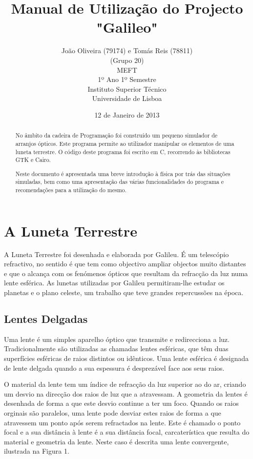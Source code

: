 \documentclass[a4paper,12pt]{article}
\begin{document}
\title{\bf Manual de Utilização do Projecto "Galileo"}
\author{João Oliveira (79174) e Tomás Reis (78811)\\
(Grupo 20)\\ 
MEFT \\
1º Ano 1º Semestre \\ 
Instituto Superior Técnico \\
Universidade de Lisboa}
\date{12 de Janeiro de 2013}
\maketitle
\begin{abstract}
No âmbito da cadeira de Programação foi construído um pequeno simulador de arranjos ópticos. Este programa permite ao utilizador manipular os elementos de uma luneta terrestre. O código deste programa foi escrito em C, recorrendo às bibliotecas GTK e Cairo.
\par
Neste documento é apresentada uma breve introdução à física por trás das situações simuladas, bem como uma apresentação das várias funcionalidades do programa e recomendações para a utilização do mesmo.
\end{abstract}

\pagebreak

\tableofcontents

\pagebreak


\section{A Luneta Terrestre}

A Luneta Terrestre foi desenhada e elaborada por Galileu. É um telescópio refractivo, no sentido é que tem como objectivo ampliar objectos muito distantes e que o alcança com os fenómenos ópticos que resultam da refracção da luz numa lente esférica. As lunetas utilizadas por Galileu permitiram-lhe estudar os planetas e o plano celeste, um trabalho que teve grandes repercussões na época.

\subsection{Lentes Delgadas}

Uma lente é um simples aparelho óptico que transmite e redirecciona a luz. Tradicionalmente são utilizadas as chamadas lentes esféricas, que têm duas superfícies esféricas de raios distintos ou idênticos. Uma lente esférica é designada de lente delgada quando a sua espessura é desprezável face aos seus raios.
\par
O material da lente tem um índice de refracção da luz superior ao do ar, criando um desvio na direcção dos raios de luz que a atravessam. A geometria da lentes é desenhada de forma a que este desvio continue a ter um foco. Quando os raios orginais são paralelos, uma lente pode desviar estes raios de forma a que atravessem um ponto após serem refractados na lente. Este é chamado o ponto focal e a sua distância à lente é a sua distância focal, carcaterística que resulta do material e geometria da lente. Neste caso é descrita uma lente convergente, ilustrada na Figura 1.
\end{document}
